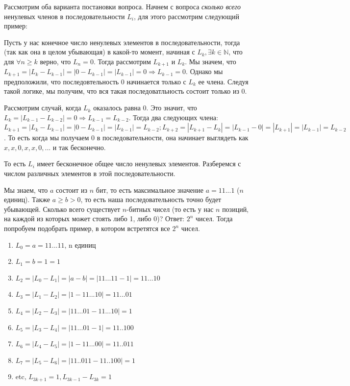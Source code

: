 \documentclass{article}
\begin{document}
Рассмотрим оба варианта постановки вопроса. Начнем с вопроса \textit{сколько всего} ненулевых членов в последовательности $L_i$, для этого рассмотрим следующий пример:

Пусть у нас конечное число ненулевых элементов в последовательности, тогда (так как она в целом убывающая) в какой-то момент, начиная с $L_k, \exists k \in \mathbb{N}$, что для $\forall n \geq k$ верно, что $L_n = 0$. Тогда рассмотрим $L_{k+1}$ и $L_k$. Мы значем, что $L_{k+1} = |L_k - L_{k-1}| = |0 - L_{k-1}| = |L_{k-1}| = 0 \Rightarrow L_{k-1} = 0$. Однако мы предположили, что последовтельность 0 начинается только с $L_k$ ее члена. Следуя такой логике, мы получим, что вся такая последоватльность состоит только из 0.

Рассмотрим случай, когда $L_k$ оказалось равна 0. Это значит, что $L_k = |L_{k-1} - L_{k-2}| = 0 \Rightarrow L_{k-1} = L_{k-2}$. Тогда два следующих члена: $L_{k+1} = |L_{k} - L_{k-1}| = |0 - L_{k-1}| = |L_{k-1}| = L_{k-2}; L_{k+2} = |L_{k+1} - L_{k}| = |L_{k-1} - 0| = |L_{k+1}| = |L_{k-1}| = L_{k-2}$. То есть когда мы получаем 0 в последовательности, она начинает выглядеть как $x, x, 0, x, x, 0, ...$ и так бесконечно.

То есть $L_i$ имеет бесконечное общее число ненулевых элементов. Разберемся с числом различных элементов в этой последовательности.

Мы знаем, что $a$ состоит из $n$ бит, то есть максимальное значение $a = 11...1$ ($n$ единиц). Также $a \geq b > 0$, то есть наша последовательность точно будет убывающей. Сколько всего существует $n$-битных чисел (то есть у нас $n$ позиций, на каждой из которых может стоять либо 1, либо 0)? Ответ: $2^n$ чисел. Тогда попробуем подобрать пример, в котором встретятся все $2^n$ чисел.

\begin{enumerate}
    \item $L_0 = a = 11...11$, n единиц
    \item $L_1 = b = 1 = 1$
    \item $L_2 = |L_0 - L_1| = |a-b| = |11...11 - 1| = 11...10$
    \item $L_3 = |L_1 - L_2| = |1 - 11...10| = 11...01$
    \item $L_4 = |L_2 - L_3| = |11...01 - 11...10| = 1$
    \item $L_5 = |L_3 - L_4| = |11...01 - 1| = 11..100$
    \item $L_6 = |L_4 - L_5| = |1 - 11...00| = 11..011$
    \item $L_7 = |L_5 - L_6| = |11..011 - 11..100| = 1$
    \item etc, $L_{3k+1} = 1, L_{3k-1} - L_{3k} = 1$
\end{enumerate}
\end{document}
